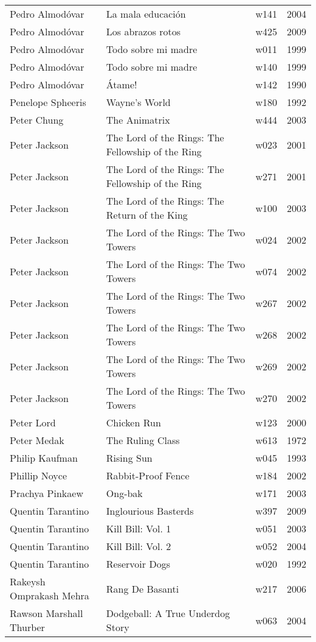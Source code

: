 \documentclass{article}
\begin{document}
\begin {center}
\begin{longtable}{l p{10cm} l l}
Pedro Almodóvar & La mala educación & w141 & 2004 \\
Pedro Almodóvar & Los abrazos rotos & w425 & 2009 \\
Pedro Almodóvar & Todo sobre mi madre & w011 & 1999 \\
Pedro Almodóvar & Todo sobre mi madre & w140 & 1999 \\
Pedro Almodóvar & Átame! & w142 & 1990 \\
Penelope Spheeris & Wayne's World & w180 & 1992 \\
Peter Chung & The Animatrix & w444 & 2003 \\
Peter Jackson & The Lord of the Rings: The Fellowship of the Ring & w023 & 2001 \\
Peter Jackson & The Lord of the Rings: The Fellowship of the Ring & w271 & 2001 \\
Peter Jackson & The Lord of the Rings: The Return of the King & w100 & 2003 \\
Peter Jackson & The Lord of the Rings: The Two Towers & w024 & 2002 \\
Peter Jackson & The Lord of the Rings: The Two Towers & w074 & 2002 \\
Peter Jackson & The Lord of the Rings: The Two Towers & w267 & 2002 \\
Peter Jackson & The Lord of the Rings: The Two Towers & w268 & 2002 \\
Peter Jackson & The Lord of the Rings: The Two Towers & w269 & 2002 \\
Peter Jackson & The Lord of the Rings: The Two Towers & w270 & 2002 \\
Peter Lord & Chicken Run & w123 & 2000 \\
Peter Medak & The Ruling Class & w613 & 1972 \\
Philip Kaufman & Rising Sun & w045 & 1993 \\
Phillip Noyce & Rabbit-Proof Fence & w184 & 2002 \\
Prachya Pinkaew & Ong-bak & w171 & 2003 \\
Quentin Tarantino & Inglourious Basterds & w397 & 2009 \\
Quentin Tarantino & Kill Bill: Vol. 1 & w051 & 2003 \\
Quentin Tarantino & Kill Bill: Vol. 2 & w052 & 2004 \\
Quentin Tarantino & Reservoir Dogs & w020 & 1992 \\
Rakeysh Omprakash Mehra & Rang De Basanti & w217 & 2006 \\
Rawson Marshall Thurber & Dodgeball: A True Underdog Story & w063 & 2004 \\

\end{longtable}
\end{center}
\end{document}
